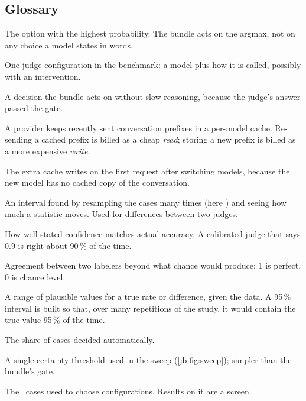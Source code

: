 \subsection{Glossary}\label{jb:app:glossary}

\begin{description}[leftmargin=1.2em,style=nextline,itemsep=3pt]
  \item[Argmax] The option with the highest probability. The bundle acts on the argmax, not on any
    choice a model states in words.
  \item[Arm] One judge configuration in the benchmark: a model plus how it is called, possibly with an
    intervention.
  \item[Automatic decision] A decision the bundle acts on without slow reasoning, because the judge's
    answer passed the gate.
  \item[Cache read, cache write] A provider keeps recently sent conversation prefixes in a per-model
    cache. Re-sending a cached prefix is billed as a cheap \emph{read}; storing a new prefix is billed as a
    more expensive \emph{write}.
  \item[Cache rebuild] The extra cache writes on the first request after switching models, because the new
    model has no cached copy of the conversation.
  \item[Bootstrap confidence interval] An interval found by resampling the cases many times (here
    \BootstrapB) and seeing how much a statistic moves. Used for differences between two judges.
  \item[Calibration] How well stated confidence matches actual accuracy. A calibrated judge that says
    0.9 is right about 90\,\% of the time.
  \item[Cohen's kappa ($\kappa$)] Agreement between two labelers beyond what chance would produce;
    1 is perfect, 0 is chance level.
  \item[Confidence interval (CI)] A range of plausible values for a true rate or difference, given the
    data. A 95\,\% interval is built so that, over many repetitions of the study, it would contain the
    true value 95\,\% of the time.
  \item[Coverage] The share of cases decided automatically.
  \item[Cutoff] A single certainty threshold used in the sweep (\cref{jb:fig:sweep}); simpler than the
    bundle's gate.
  \item[Dev split] The \DevN\ cases used to choose configurations. Results on it are a screen.

\end{description}
